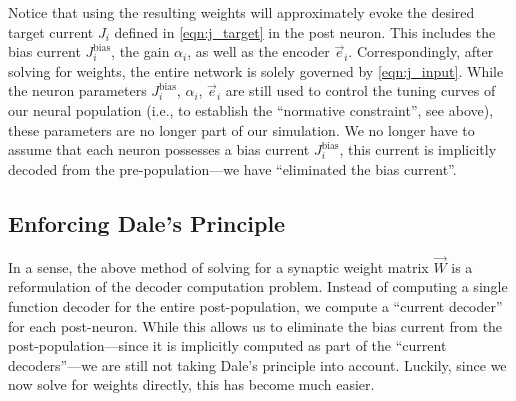 \documentclass[10pt,letterpaper,oneside]{article}
\begin{document}
Notice that using the resulting weights will approximately evoke the desired target current $J_i$ defined in \cref{eqn:j_target} in the post neuron. This includes the bias current $J^\mathrm{bias}_i$, the gain $\alpha_i$, as well as the encoder $\vec e_i$. Correspondingly, after solving for weights, the entire network is solely governed by \cref{eqn:j_input}. While the neuron parameters $J^\mathrm{bias}_i$, $\alpha_i$, $\vec e_i$ are still used to control the tuning curves of our neural population (i.e., to establish the \enquote{normative constraint}, see above), these parameters are no longer part of our simulation. We no longer have to assume that each neuron possesses a bias current $J^\mathrm{bias}_i$, this current is implicitly decoded from the pre-population---we have \enquote{eliminated the bias current}.


\subsection{Enforcing Dale's Principle}

In a sense, the above method of solving for a synaptic weight matrix $\vec W$ is a reformulation of the decoder computation problem. Instead of computing a single function decoder for the entire post-population, we compute a \enquote{current decoder} for each post-neuron. While this allows us to eliminate the bias current from the post-population---since it is implicitly computed as part of the \enquote{current decoders}---we are still not taking Dale's principle into account. Luckily, since we now solve for weights directly, this has become much easier.
\end{document}
